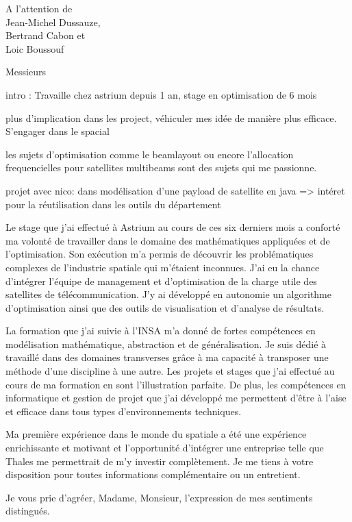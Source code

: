 \documentclass[12pt]{lettre}
\begin{document}
\begin{letter}{A l'attention de\\Jean-Michel Dussauze,\\Bertrand Cabon et\\ Loic Boussouf}
\address{Victor Cameo Ponz\\47 rue Guynemer\\31200 Toulouse}
\nofax

\opening{Messieurs}

intro : Travaille chez astrium depuis 1 an, stage en optimisation de 6 mois

plus d'implication dans les project, véhiculer mes idée de manière plus efficace. S'engager dans le spacial

les sujets d'optimisation comme le beamlayout ou encore l'allocation frequencielles pour satellites multibeams sont des sujets qui me passionne.

projet avec nico: dans modélisation d'une payload de satellite en java => intéret pour la réutilisation dans les outils du département

Le stage que j'ai effectué à Astrium au cours de ces six derniers mois a conforté ma volonté de travailler dans le domaine des mathématiques appliquées et de l'optimisation. Son exécution m'a permis de découvrir les problématiques complexes de l'industrie spatiale qui m'étaient inconnues. J'ai eu la chance d'intégrer l'équipe de management et d'optimisation de la charge utile des satellites de télécommunication. J'y ai développé en autonomie un algorithme d'optimisation ainsi que des outils de visualisation et d'analyse de résultats.

La formation que j'ai suivie à l'INSA m'a donné de fortes compétences en modélisation mathématique, abstraction et de généralisation. Je suis dédié à travaillé dans des domaines transverses grâce à ma capacité à transposer une méthode d'une discipline à une autre. Les projets et stages que j'ai effectué au cours de ma formation en sont l'illustration parfaite. De plus, les compétences en informatique et gestion de projet que j'ai développé me permettent d'être à l'aise et efficace dans tous types d'environnements techniques.%

Ma première expérience dans le monde du spatiale a été une expérience enrichissante et motivant et l'opportunité d'intégrer une entreprise  telle que Thales me permettrait de m'y investir complètement.
%
Je me tiens à votre disposition pour toutes informations complémentaire ou un entretient.
\closing{Je vous prie d'agréer, Madame, Monsieur, l'expression de mes sentiments distingués.}
\end{letter}
\end{document}
